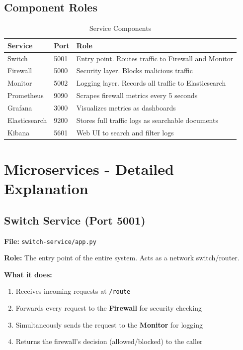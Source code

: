 \documentclass[12pt,a4paper]{article}
\begin{document}
\subsection{Component Roles}

\begin{table}[h]
\centering
\begin{tabular}{@{}lll@{}}
\toprule
\textbf{Service} & \textbf{Port} & \textbf{Role} \\
\midrule
Switch & 5001 & Entry point. Routes traffic to Firewall and Monitor \\
Firewall & 5000 & Security layer. Blocks malicious traffic \\
Monitor & 5002 & Logging layer. Records all traffic to Elasticsearch \\
Prometheus & 9090 & Scrapes firewall metrics every 5 seconds \\
Grafana & 3000 & Visualizes metrics as dashboards \\
Elasticsearch & 9200 & Stores full traffic logs as searchable documents \\
Kibana & 5601 & Web UI to search and filter logs \\
\bottomrule
\end{tabular}
\caption{Service Components}
\end{table}

\section{Microservices - Detailed Explanation}

\subsection{Switch Service (Port 5001)}

\textbf{File:} \texttt{switch-service/app.py}

\textbf{Role:} The entry point of the entire system. Acts as a network switch/router.

\textbf{What it does:}
\begin{enumerate}
    \item Receives incoming requests at \texttt{/route}
    \item Forwards every request to the \textbf{Firewall} for security checking
    \item Simultaneously sends the request to the \textbf{Monitor} for logging
    \item Returns the firewall's decision (allowed/blocked) to the caller
\end{enumerate}
\end{document}
